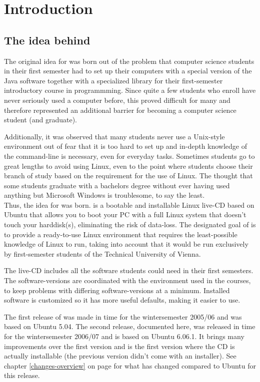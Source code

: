 
\chapter{Introduction}
\section{The idea behind \tunix}
The original idea for \tunix{} was born out of the problem that computer science
students in their first semester had to set up their computers with a special
version of the Java software together with a specialized library for their
first-semester introductory course in programmming. Since quite a few students
who enroll have never seriously used a computer before, this proved difficult
for many and therefore represented an additional barrier for becoming a computer
science student (and graduate).

Additionally, it was observed that many students never use a Unix-style
environment out of fear that it is too hard to set up and in-depth knowledge of
the command-line is necessary, even for everyday tasks. Sometimes students go to
great lengths to avoid using Linux, even to the point where students choose their
branch of study based on the requirement for the use of Linux. The thought that
some students graduate with a bachelors degree without ever having used anything
but Microsoft Windows is troublesome, to say the least.\\

Thus, the idea for \tunix{} was born. \tunix{} is a bootable and installable Linux
live-CD based on Ubuntu that allows you to boot your PC with a full Linux system
that doesn't touch your harddisk(s), eliminating the risk of data-loss. The
designated goal of \tunix{} is to provide a ready-to-use Linux environment that
requires the least-possible knowledge of Linux to run, taking into account that
it would be run exclusively by first-semester students of the Technical
University of Vienna.

The \tunix{} live-CD includes all the software students could need in their first
semesters. The software-versions are coordinated with the environment used in the
courses, to keep problems with differing software-versions at a minimum.
Installed software is customized so it has more useful defaults, making it
easier to use.

The first release of \tunix{} was made in time for the wintersemester 2005/06 and
was based on Ubuntu 5.04. The second release, documented here, was released in
time for the wintersemester 2006/07 and is based on Ubuntu 6.06.1. It brings
many improvements over the first version and is the first version where the
\tunix{} CD is actually installable (the previous version didn't come with an
installer). See chapter \ref{changes-overview} on page \pageref{changes-overview}
for what has changed compared to Ubuntu for this release.

